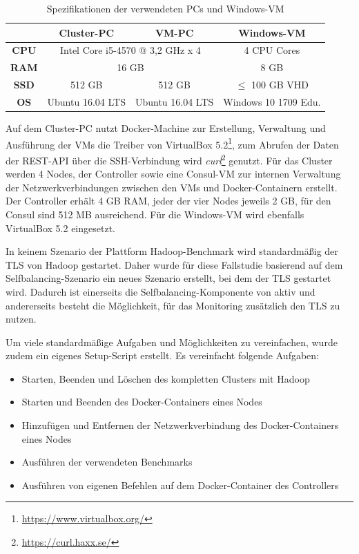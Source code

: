 \begin{table}
    \centering
    \begin{tabular}{|c|c|c|c|}
    	\hline
    	 \textbf{}   & \textbf{Cluster-PC} &         \textbf{VM-PC}          & \textbf{Windows-VM}  \\ \hline\hline
    	\textbf{CPU} & \multicolumn{2}{c|}{Intel Core i5-4570 @ 3,2 GHz x 4} &     4 CPU Cores      \\ \hline
    	\textbf{RAM} &              \multicolumn{2}{c|}{16 GB}               &         8 GB         \\ \hline
    	\textbf{SSD} &       512 GB        &             512 GB              &  $\leq$ 100 GB VHD   \\ \hline
    	\textbf{OS}  &  Ubuntu 16.04 LTS   &        Ubuntu 16.04 LTS         & Windows 10 1709 Edu. \\ \hline
    \end{tabular}
    \caption{Spezifikationen der verwendeten PCs und Windows-VM}
    \label{tab:pcSpecs}
\end{table}

Auf dem Cluster-PC nutzt Docker-Machine zur Erstellung, Verwaltung und Ausführung der VMs die Treiber von VirtualBox 5.2\footnote{\url{https://www.virtualbox.org/}}, zum Abrufen der Daten der REST-API über die SSH-Verbindung wird \emph{curl}\footnote{\url{https://curl.haxx.se/}} genutzt. Für das Cluster werden 4 Nodes, der Controller sowie eine Consul-VM zur internen Verwaltung der Netzwerkverbindungen zwischen den VMs und Docker-Containern erstellt. Der Controller erhält 4 GB RAM, jeder der vier Nodes jeweils 2 GB, für den Consul sind 512 MB ausreichend. Für die Windows-VM wird ebenfalls VirtualBox 5.2 eingesetzt.

In keinem Szenario der Plattform Hadoop-Benchmark wird standardmäßig der \ac{TLS} von Hadoop gestartet. Daher wurde für diese Fallstudie basierend auf dem Selfbalancing-Szenario ein neues Szenario erstellt, bei dem der \ac{TLS} gestartet wird. Dadurch ist einerseits die Selfbalancing-Komponente von \citeauthor{zhang2016} aktiv und andererseits besteht die Möglichkeit, für das Monitoring zusätzlich den \ac{TLS} zu nutzen.

Um viele standardmäßige Aufgaben und Möglichkeiten zu vereinfachen, wurde zudem ein eigenes Setup-Script erstellt. Es vereinfacht folgende Aufgaben:

\begin{itemize}[noitemsep]
    \item Starten, Beenden und Löschen des kompletten Clusters mit Hadoop
    \item Starten und Beenden des Docker-Containers eines Nodes
    \item Hinzufügen und Entfernen der Netzwerkverbindung des Docker-Containers eines Nodes
    \item Ausführen der verwendeten Benchmarks
    \item Ausführen von eigenen Befehlen auf dem Docker-Container des Controllers
\end{itemize}

